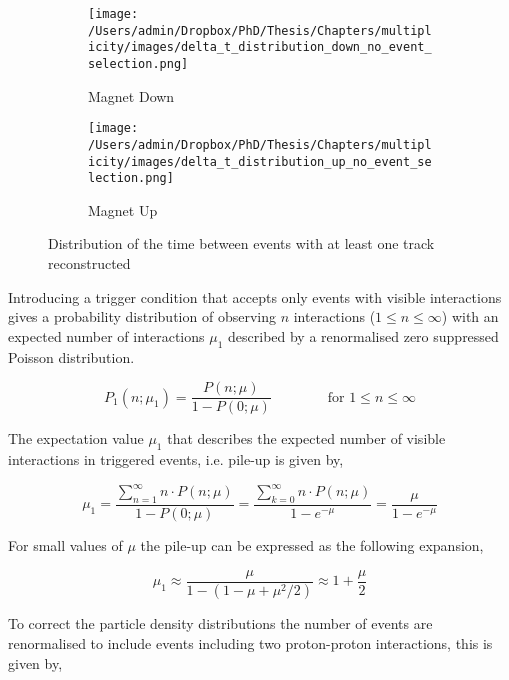 \begin{figure}[h]
	\centering
	\begin{subfigure}{0.49\textwidth}
		\centering
		\texttt{[image: /Users/admin/Dropbox/PhD/Thesis/Chapters/multiplicity/images/delta\_t\_distribution\_down\_no\_event\_selection.png]}
		\caption{Magnet Down}
	\end{subfigure}
	\begin{subfigure}{0.49\textwidth}
		\centering
		\texttt{[image: /Users/admin/Dropbox/PhD/Thesis/Chapters/multiplicity/images/delta\_t\_distribution\_up\_no\_event\_selection.png]}
		\caption{Magnet Up}
	\end{subfigure}
	\caption{Distribution of the time between events with at least one track reconstructed}
	\label{fig: delta t distribution}
\end{figure}

Introducing a trigger condition that accepts only events with visible interactions gives a probability distribution of observing $n$ interactions ($1 \le n \le \infty$) with an expected number of interactions $\mu_1$ described by a renormalised zero suppressed Poisson distribution.

\begin{equation}
	P_1(n; \mu_1) = \frac{P(n; \mu)}{1 - P(0; \mu)} \,\,\,\,\,\,\,\,\,\,\,\,\,\,\,\,\,\,\,\,\,\,\,\, \mathrm{for} \,\, 1 \le n \le \infty
\end{equation}

The expectation value $\mu_1$ that describes the expected number of visible interactions in triggered events, i.e. pile-up is given by,

\begin{equation}
	\mu_1 = \frac{\sum^{\infty}_{n=1}{n\cdot P(n; \mu)}}{1 - P(0; \mu)} = \frac{\sum^{\infty}_{k=0}{n\cdot P(n; \mu)}}{1-e^{-\mu}} = \frac{\mu}{1 - e^{-\mu}}
\end{equation}

For small values of $\mu$ the pile-up can be expressed as the following expansion,

\begin{equation}
	\mu_1 \approx \frac{\mu}{1 - (1 - \mu + \mu^2/2)} \approx 1 + \frac{\mu}{2}
	\label{equation: mu approximation}
\end{equation}

To correct the particle density distributions the number of events are renormalised to include events including two proton-proton interactions, this is given by,

